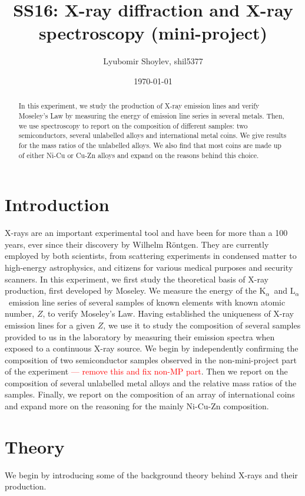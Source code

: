 \documentclass[11pt,a4paper,twoside,onecolumn]{article}
\title{\textbf{SS16: X-ray diffraction and X-ray spectroscopy (mini-project)}}
\author{Lyubomir Shoylev, shil5377}
\date{\today}
\newcommand{\reminder}[1]{\textcolor{red}{#1}}
\newcommand{\Kalpha}{$\mathrm{K}_\alpha$~}
\newcommand{\Lalpha}{$\mathrm{L}_\alpha$~}
\begin{document}
\maketitle

\begin{abstract}
    In this experiment, we study the production of X-ray emission lines and verify Moseley's Law by measuring the energy of emission line series in several metals. Then, we use spectroscopy to report on the composition of different samples: two semiconductors, several unlabelled alloys and international metal coins. We give results for the mass ratios of the unlabelled alloys. We also find that most coins are made up of either Ni-Cu or Cu-Zn alloys and expand on the reasons behind this choice.
\end{abstract}

\section{Introduction}
X-rays are an important experimental tool and have been for more than a 100 years, ever since their discovery by Wilhelm R\"{o}ntgen. They are currently employed by both scientists, from scattering experiments in condensed matter to high-energy astrophysics, and citizens for various medical purposes and security scanners. In this experiment, we first study the theoretical basis of X-ray production, first developed by Moseley. We measure the energy of the \Kalpha and \Lalpha emission line series of several samples of known elements with known atomic number, $Z$, to verify Moseley's Law. Having established the uniqueness of X-ray emission lines for a given $Z$, we use it to study the composition of several samples provided to us in the laboratory by measuring their emission spectra when exposed to a continuous X-ray source. We begin by independently confirming the composition of two semiconductor samples observed in the non-mini-project part of the experiment \reminder{--- remove this and fix non-MP part}. Then we report on the composition of several unlabelled metal alloys and the relative mass ratios of the samples. Finally, we report on the composition of an array of international coins and expand more on the reasoning for the mainly Ni-Cu-Zn composition.

\section{Theory}
We begin by introducing some of the background theory behind X-rays and their production.
\end{document}
